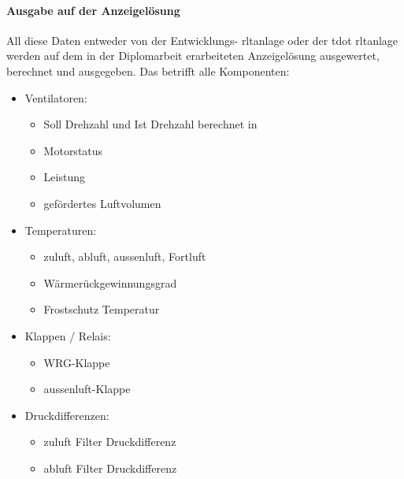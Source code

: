 \paragraph{Ausgabe auf der Anzeigelösung}
All diese Daten entweder von der Entwicklungs- \ac{rltanlage} oder der \gls{tdot} \ac{rltanlage} werden auf dem in der Diplomarbeit erarbeiteten Anzeigelösung ausgewertet, berechnet und ausgegeben. 
Das betrifft alle Komponenten:
\begin{itemize}

	\item Ventilatoren: 
	\begin{itemize}
		\item Soll Drehzahl und Ist Drehzahl berechnet in %
		\item Motorstatus
		\item Leistung 
		\item gefördertes Luftvolumen
	\end{itemize}

	\item Temperaturen:
	\begin{itemize}
		\item \gls{zuluft}, \gls{abluft}, \gls{aussenluft}, Fortluft
		\item Wärmerückgewinnungsgrad
		\item Frostschutz Temperatur 
	\end{itemize}

	\item Klappen / Relais:
	\begin{itemize}
		\item WRG-Klappe
		\item \gls{aussenluft}-Klappe 
	\end{itemize}
	
	\item Druckdifferenzen:
	\begin{itemize}
		\item \gls{zuluft} Filter Druckdifferenz
		\item \gls{abluft} Filter Druckdifferenz
	\end{itemize}
\end{itemize}

